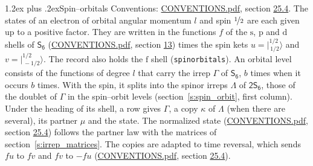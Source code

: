 \documentclass[10pt,a4paper]{article}
\makeatletter
\renewcommand\section{\@startsection{section}{1}{\z@}{-3ex plus -1ex minus -.2ex}%
  {1.2ex plus .2ex}{\normalfont\large\sffamily\bfseries\color{parttitle}}}
\numberwithin{equation}{section}
\newcommand{\grp}[1]{\mathsf{#1}}
\newcommand{\orbital}[1]{\mathrm{#1}}
\newcommand{\mult}{\kappa}
\newcommand{\intx}{\mu}
\newcommand{\jm}[2]{\bigl\lvert{}^{#1}_{\,#2}\bigr\rangle}
\makeatother
\begin{document}
\section{Spin--orbitals}\label{s:spin_orbitals}
Conventions: \href{../../CONVENTIONS.pdf}{CONVENTIONS.pdf}, section \href{../../CONVENTIONS.pdf\#conv.25.4}{25.4}.
\leavevmode\label{n:index.orbital.l}The states of an electron of orbital angular momentum $l$ and spin $\nicefrac{1}{2}$ are each given up to a positive factor. \label{n:local.spinor.uv}\label{n:local.function.f}They are written in the functions $f$ of the $\orbital{s}$, $\orbital{p}$ and $\orbital{d}$ shells of \href{../../../rotation/data/pdf/S6.pdf}{$\grp{S_{6}}$} (\href{../../CONVENTIONS.pdf}{CONVENTIONS.pdf}, section \href{../../../rotation/CONVENTIONS.pdf\#conv.13}{13}) times the spin kets $u = \jm{1/2}{1/2}$ and $v = \jm{1/2}{-1/2}$. The record also holds the $\orbital{f}$ shell (\texttt{spinorbitals}). An orbital level consists of the functions of degree $l$ that carry the irrep $\Gamma$ of \href{../../../rotation/data/pdf/S6.pdf}{$\grp{S_{6}}$}, $b$ times when it occurs $b$ times. With the spin, it splits into the spinor irreps $\Lambda$ of $\grp{2S_{6}}$, those of the doublet of $\Gamma$ in the spin--orbit levels (section~\ref{s:spin_orbit}, first column). \label{n:head.state}Under the heading of its shell, a row gives $\Gamma$, a copy $\mult$ of $\Lambda$ (when there are several), its partner $\intx$ and the state. The normalized state (\href{../../CONVENTIONS.pdf}{CONVENTIONS.pdf}, section \href{../../CONVENTIONS.pdf\#conv.25.4}{25.4}) follows the partner law with the matrices of section~\ref{s:irrep_matrices}. The copies are adapted to time reversal, which sends $f u$ to $f v$ and $f v$ to $-f u$ (\href{../../CONVENTIONS.pdf}{CONVENTIONS.pdf}, section \href{../../CONVENTIONS.pdf\#conv.25.4}{25.4}).
\end{document}
